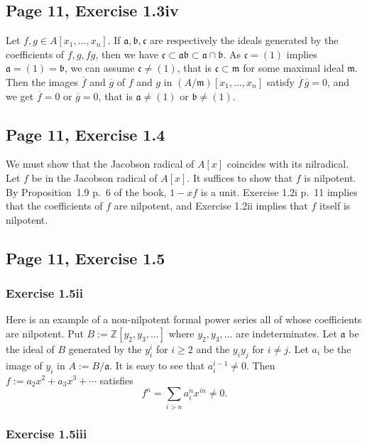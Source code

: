 \documentclass[parskip=half,fontsize=12pt]{scrartcl}%
\newcommand{\mf}{\mathfrak}
\newcommand{\aaa}{\mf a}
\newcommand{\bbb}{\mf b}
\newcommand{\ccc}{\mf c}
\newcommand{\mmm}{\mf m}
\begin{document}
\subsection{Page 11, Exercise 1.3iv}%

Let $f,g\in A[x_1,\ldots,x_n]$. If $\aaa,\bbb,\ccc$ are respectively the ideals generated by the coefficients of $f,g,fg$, then we have $\ccc\subset\aaa\bbb\subset\aaa\cap\bbb$. As $\ccc=(1)$ implies $\aaa=(1)=\bbb$, we can assume $\ccc\ne(1)$, that is $\ccc\subset\mmm$ for some maximal ideal $\mmm$. Then the images $\overline f$ and $\overline g$ of $f$ and $g$ in $(A/\mmm)[x_1,\ldots,x_n]$ satisfy $\overline f\,\overline g=0$, and we get $\overline f=0$ or $\overline g=0$, that is $\aaa\ne(1)$ or $\bbb\ne(1)$.

\subsection{Page 11, Exercise 1.4}%

We must show that the Jacobson radical of $A[x]$ coincides with its nilradical. Let $f$ be in the Jacobson radical of $A[x]$. It suffices to show that $f$ is nilpotent. By Proposition~1.9 p.~6 of the book, $1-xf$ is a unit. Exercise 1.2i p.~11 implies that the coefficients of $f$ are nilpotent, and Exercise 1.2ii implies that $f$ itself is nilpotent.

\subsection{Page 11, Exercise 1.5}%

\subsubsection{Exercise 1.5ii}

Here is an example of a non-nilpotent formal power series all of whose coefficients are nilpotent. Put $B:=\mathbb Z[y_2,y_3,\dots]$ where $y_2,y_3,\dots$ are indeterminates. Let $\aaa$ be the ideal of $B$ generated by the $y_i^i$ for $i\ge2$ and the $y_iy_j$ for $i\neq j$. Let $a_i$ be the image of $y_i$ in $A:=B/\aaa$. It is easy to see that $a_i^{i-1}\neq0$. Then $f:=a_2x^2+a_3x^3+\cdots$ satisfies 
$$
f^n=\sum_{i>n}a_i^nx^{in}\neq0.
$$

\subsubsection{Exercise 1.5iii}%
\end{document}
